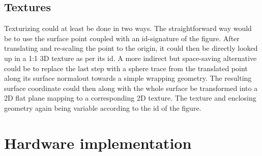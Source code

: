 			\subsection{Textures}
		
				Texturizing could at least be done in two ways. The
				straightforward way would be to use the surface point coupled
				with an id-signature of the figure. After translating and
				re-scaling the point to the origin, it could then be directly
				looked up in a 1:1 3D texture as per its id. A more indirect
				but space-saving alternative could be to replace the last step
				with a sphere trace from the translated point along its surface
				normal\footnotemark out towards a simple wrapping geometry. The
				resulting surface coordinate could then along with the whole
				surface be transformed into a 2D flat plane mapping to a
				corresponding 2D texture. The texture and enclosing geometry
				again being variable according to the id of the figure.
		
		
	\section{Hardware implementation}
